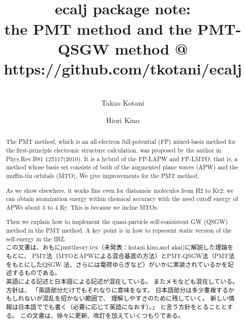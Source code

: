 \documentclass[a4paper,10pt,aip,onecolumn,amsmath,amssymb,floatfix,rmp]{revtex4-1}
\begin{document}
\title{{\Huge \ \\ ecalj package note:}\\ the PMT method and the
PMT-QSGW method  @ https://github.com/tkotani/ecalj}
\author{\large \ \\ Takao Kotani}
\author{\large Hiori Kino}
\vspace{1cm}
\begin{abstract}
The PMT method, which is an all-electron full-potential (FP) mixed-basis
method for the first-principle electronic structure calculation, was proposed 
by the author in Phys.Rev.B81 125117(2010). 
It is a hybrid of the FP-LAPW and FP-LMTO, that is, a method 
whose basis set consists of both of the augmented plane waves (APW) 
and the muffin-tin orbitals (MTO). We give improvements for the PMT
method. 

 As we show elsewhere, it works fine even for diatomoic molecules
from H2 to Kr2; we can obtain atomization energy within chemical
accuracy with the need cutoff energy of APWs about 3 to 4 Ry. This is
because we inclue MTOs.

Then we explain how to implement the quasi-particle
self-conisistent GW (QSGW) method in the PMT method.
A key point is in how to repsesent static version of the self-energy 
in the IBZ.\\

この文書は、おもにpmttheory.tex（未発表：kotani,kino,and akai)に解説した理論をもとに、
PMT法（MTOとAPWによる混合基底の方法）とPMT-QSGW法（PMT法をもとにしたQSGW
法、さらには電荷ゆらぎなど）がいかに実装されているかを記述するものである。\\

英語による記述と日本語による記述が混在している。
またメモなども混在している。方針は、
「英語部分だけでもそれなりに意味をなす。
日本語部分は多少重複するかもしれないが混乱を招かない範囲で、
理解しやすさのために残していく。
新しい情報は日本語ででも書く（必要に応じて英語になおす）。」
と言う方針をとることとする。
この文書は、徐々に更新、改訂を加えていくつもりである。

\end{abstract}
\maketitle
\tableofcontents
\end{document}
